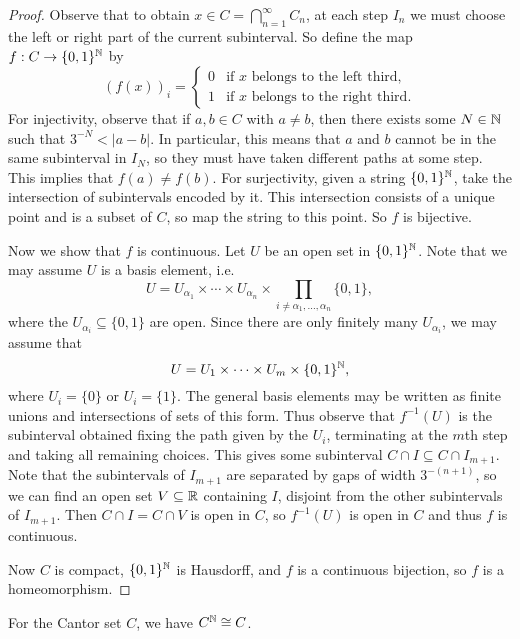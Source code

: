 \begin{proof}
  Observe that to obtain $x \in C = \bigcap_{n=1}^\infty C_n$,
  at each step $I_n$ we must choose the left or right
  part of the current subinterval.
  So define the map $f : C \to \{0, 1\}^{\mathbb{N}}$ by
  \[
    (f(x))_i = \begin{cases}
      0 & \text{if $x$ belongs to the left third}, \\
      1 & \text{if $x$ belongs to the right third}.
    \end{cases}
  \]
  For injectivity, observe that if $a, b \in C$
  with $a \ne b$, then there exists some
  $N \in \mathbb{N}$ such that $3^{-N} < |a - b|$.
  In particular, this means that $a$ and $b$ cannot
  be in the same subinterval in $I_N$, so they
  must have taken different paths at some step. This
  implies that $f(a) \ne f(b)$.
  For surjectivity, given a string $\{0, 1\}^{\mathbb{N}}$,
  take the intersection of subintervals encoded
  by it. This intersection consists of a unique
  point and is a subset of $C$, so map the string to
  this point. So $f$ is bijective.

  Now we show that $f$ is continuous. Let $U$
  be an open set in $\{0, 1\}^{\mathbb{N}}$. Note that
  we may assume $U$ is a basis element, i.e.
  \[
    U = U_{\alpha_1} \times \cdots \times U_{\alpha_n} \times \prod_{i \ne \alpha_1, \ldots, \alpha_n} \{0, 1\},
  \]
  where the $U_{\alpha_i} \subseteq \{0, 1\}$ are
  open. Since there are only finitely
  many $U_{\alpha_i}$, we may assume that
  \[
    U = U_1 \times \dots \times U_m \times \{0, 1\}^{\mathbb{N}},
  \]
  where $U_i = \{0\}$ or $U_i = \{1\}$. The general
  basis elements may be written as finite unions and
  intersections of sets of this form. Thus observe
  that $f^{-1}(U)$ is the subinterval obtained
  fixing the path given by the $U_i$,
  terminating at the $m$th step and taking all
  remaining choices. This gives some
  subinterval $C \cap I \subseteq C \cap I_{m + 1}$.
  Note that the subintervals of $I_{m + 1}$
  are separated by gaps of width $3^{-(n + 1)}$, so
  we can find an open set $V \subseteq \mathbb{R}$ containing $I$,
  disjoint from the other subintervals of $I_{m + 1}$.
  Then $C \cap I = C \cap V$ is open in $C$, so
  $f^{-1}(U)$ is open in $C$ and thus $f$ is
  continuous.

  Now $C$ is compact, $\{0, 1\}^{\mathbb{N}}$ is Hausdorff,
  and $f$ is a continuous bijection,
  so $f$ is a homeomorphism.
\end{proof}

\begin{prop}
  For the Cantor set $C$, we have $C^{\mathbb{N}} \cong C$.
\end{prop}

